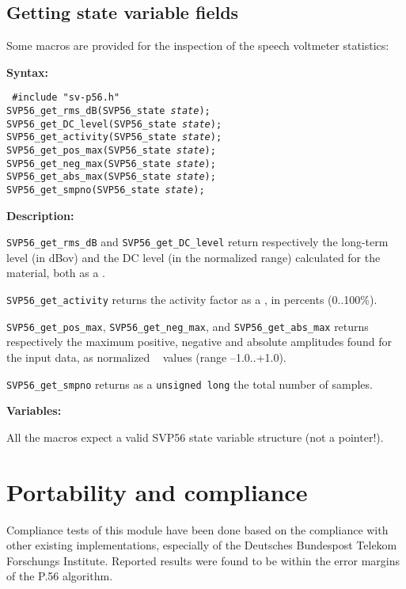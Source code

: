 \subsection{Getting state variable fields} \label{using-P56-fields}

Some macros are provided for the inspection of the speech voltmeter statistics:

{\bf Syntax: }

{\tt 
\#include "sv-p56.h"\\
SVP56\_get\_rms\_dB(SVP56\_state {\em state});\\
SVP56\_get\_DC\_level(SVP56\_state {\em state});\\
SVP56\_get\_activity(SVP56\_state {\em state});\\
SVP56\_get\_pos\_max(SVP56\_state {\em state});\\
SVP56\_get\_neg\_max(SVP56\_state {\em state});\\
SVP56\_get\_abs\_max(SVP56\_state {\em state});\\
SVP56\_get\_smpno(SVP56\_state {\em state});
}

{\bf Description: }

{\tt SVP56\_get\_rms\_dB} and {\tt SVP56\_get\_DC\_level}
return respectively the long-term level (in dBov) and the DC level (in
the normalized range) calculated for the material, both as a \double.

{\tt SVP56\_get\_activity} returns the activity factor as a \double, 
in percents (0..100\%).

{\tt SVP56\_get\_pos\_max}, {\tt SVP56\_get\_neg\_max}, and 
{\tt SVP56\_get\_abs\_max} returns respectively the maximum
positive, negative and absolute amplitudes found for the input
data, as normalized \double~ values (range --1.0..+1.0).

{\tt SVP56\_get\_smpno} returns as a {\tt unsigned long} the
total number of samples.


{\bf Variables: }
  
All the macros expect a valid SVP56 state variable
structure (not a pointer!).


\section{Portability and compliance}

Compliance tests of this module have been done based on the compliance
with other existing implementations, especially of the Deutsches
Bundespost Telekom Forschungs Institute. Reported results were found to be
within the error margins of the P.56 algorithm.

